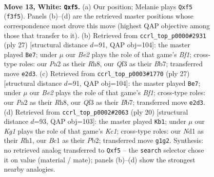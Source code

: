 \documentclass[11pt]{article}
\begin{document}
\clearpage

\begin{figure}[p]\centering
\begin{subfigure}{0.46\textwidth}\centering
\resizebox{\linewidth}{!}{%
\newchessgame
\chessboard[
  setfen={rn2kbnr/p3q1p1/2p5/1p1p1pPp/3P4/5Q1P/PPP1BP2/R1BN1RK1 w kq f6 0 13},
  showmover=false,
  pgfstyle=straightmove, color=movearrow, markmove={f3-f5}
]}
\caption{}
\end{subfigure}\hfill
\begin{subfigure}{0.46\textwidth}\centering
\resizebox{\linewidth}{!}{%
\newchessgame
\chessboard[
  setfen={r3kb1r/1b1n1ppp/pp1qp3/8/3PP3/P2B1N2/2Q2PPP/R1B1K2R b KQkq - 1 14},
  showmover=false,
  pgfstyle=straightmove, color=movearrow, markmove={f8-e7}
]}
\caption{}
\end{subfigure}
\\[4pt]
\begin{subfigure}{0.46\textwidth}\centering
\resizebox{\linewidth}{!}{%
\newchessgame
\chessboard[
  setfen={r3kb1r/1b1n1ppp/pp1qp3/8/3PP3/P2B1N2/2Q2PPP/R1B1K2R b KQkq - 1 14},
  showmover=false,
  pgfstyle=straightmove, color=movearrow, markmove={f8-e7}
]}
\caption{}
\end{subfigure}\hfill
\begin{subfigure}{0.46\textwidth}\centering
\resizebox{\linewidth}{!}{%
\newchessgame
\chessboard[
  setfen={2r1kbnr/1bqp1ppp/p3p3/1p6/3QPP2/2NBB3/PPP3PP/2KR3R w k - 4 11},
  showmover=false,
  pgfstyle=straightmove, color=movearrow, markmove={c1-b1}
]}
\caption{}
\end{subfigure}
\caption{\textbf{Move 13, White: \texttt{Qxf5}.} (a) Our position; Melanie plays \texttt{Qxf5} (\texttt{f3f5}). Panels (b)--(d) are the retrieved master positions whose correspondence most drove this move (highest QAP objective among those that transfer to it). (b) Retrieved from \texttt{ccrl\_top\_p0000\#2931} (ply 27) [structural distance $d$=91, QAP obj=104]: the master played \texttt{Be7}; under $\mu$ our \emph{Be2} plays the role of that game's \emph{Bf1}; cross-type roles: our \emph{P}a2 as their \emph{R}h8, our \emph{Q}f3 as their \emph{B}b7; transferred move \texttt{e2d3}. (c) Retrieved from \texttt{ccrl\_top\_p0003\#1770} (ply 27) [structural distance $d$=91, QAP obj=104]: the master played \texttt{Be7}; under $\mu$ our \emph{Be2} plays the role of that game's \emph{Bf1}; cross-type roles: our \emph{P}a2 as their \emph{R}h8, our \emph{Q}f3 as their \emph{B}b7; transferred move \texttt{e2d3}. (d) Retrieved from \texttt{ccrl\_top\_p0002\#2063} (ply 20) [structural distance $d$=93, QAP obj=103]: the master played \texttt{Kb1}; under $\mu$ our \emph{Kg1} plays the role of that game's \emph{Kc1}; cross-type roles: our \emph{N}d1 as their \emph{R}h1, our \emph{B}c1 as their \emph{P}b2; transferred move \texttt{g1g2}. Synthesis: no retrieved analog transferred to \texttt{Qxf5} -- the \texttt{search} selector chose it on value (material / mate); panels (b)--(d) show the strongest nearby analogies.}
\label{fig:thought-m24}
\end{figure}
\end{document}
